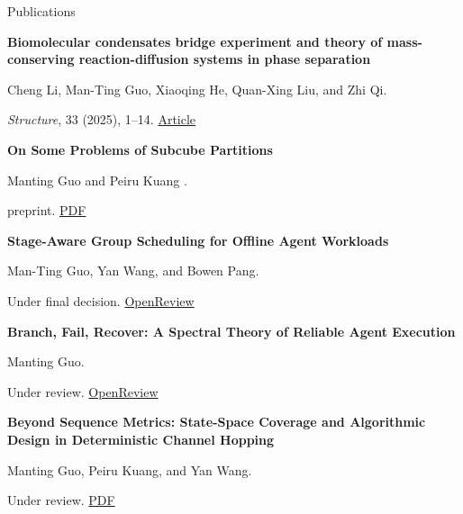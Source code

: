 \begin{rubric}{Publications}

\entry*[2025] \textbf{Biomolecular condensates bridge experiment and theory of mass-conserving reaction-diffusion systems in phase separation}
\par Cheng Li, Man-Ting Guo, Xiaoqing He, Quan-Xing Liu, and Zhi Qi.
\par \emph{Structure}, 33 (2025), 1--14. \href{https://www.cell.com/structure/fulltext/S0969-2126(25)00216-3}{Article}

 \textbf{On Some Problems of Subcube Partitions}
\par Manting Guo and Peiru Kuang .
\par preprint. \href{https://drive.google.com/file/d/1FDEi9_IqdDMKm1e9Sk-L4z6YuCZwjYQu/view?usp=drive_link}{PDF}

\entry*[AAAI 2027] \textbf{Stage-Aware Group Scheduling for Offline Agent Workloads}
\par Man-Ting Guo, Yan Wang, and Bowen Pang.
\par Under final decision. \href{https://openreview.net/forum?id=xpJiRqbBUk}{OpenReview}

\entry*[AISTATS 2027] \textbf{Branch, Fail, Recover: A Spectral Theory of Reliable Agent Execution}
\par Manting Guo.
\par Under review. \href{https://openreview.net/pdf?id=K8nXZs9tc4}{OpenReview}

 \textbf{Beyond Sequence Metrics: State-Space Coverage and Algorithmic Design in Deterministic Channel Hopping}
\par Manting Guo, Peiru Kuang, and Yan Wang.
\par Under review. \href{https://drive.google.com/file/d/1iFqwIxYBBEtUmA8VOvEefT5MZHGhnZym/view?usp=drive_link}{PDF}
\end{rubric}
